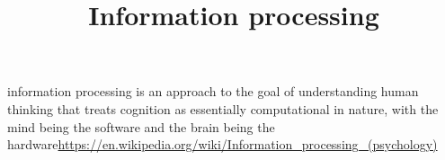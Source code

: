 \documentclass[a4paper]{article}
\title{Information processing}
\date{}
\begin{document}
    \maketitle
    information processing is an approach to the goal of understanding human thinking that treats cognition as essentially computational in nature, with the mind being the software and the brain being the hardware\url{https://en.wikipedia.org/wiki/Information_processing_(psychology)}
\end{document}

